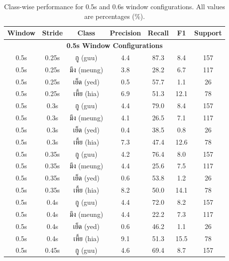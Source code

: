 \documentclass[11pt]{article}
\newcommand{\textthai}[1]{{\thaifont #1}}
\begin{document}
\begin{table}[H]
    \caption{Class-wise performance for 0.5s and 0.6s window configurations. All values are percentages (\%).}
    \centering
    \label{tab:class-performance-0.5-0.6}
    \scriptsize
    \setlength{\tabcolsep}{3pt}
    \begin{tabular}{|c|c|c|c|c|c|c|}
        \hline
        \textbf{Window} & \textbf{Stride} & \textbf{Class} & \textbf{Precision} & \textbf{Recall} & \textbf{F1} & \textbf{Support} \\
        \hline
        \multicolumn{7}{|c|}{\textbf{0.5s Window Configurations}} \\
        \hline
        0.5s & 0.25s & \textthai{กู} (guu) & 4.4 & 87.3 & 8.4 & 157 \\
        0.5s & 0.25s & \textthai{มึง} (meung) & 3.8 & 28.2 & 6.7 & 117 \\
        0.5s & 0.25s & \textthai{เย็ด} (yed) & 0.5 & 57.7 & 1.1 & 26 \\
        0.5s & 0.25s & \textthai{เหี้ย} (hia) & 6.9 & 51.3 & 12.1 & 78 \\
        \hline
        0.5s & 0.3s & \textthai{กู} (guu) & 4.4 & 79.0 & 8.4 & 157 \\
        0.5s & 0.3s & \textthai{มึง} (meung) & 4.1 & 26.5 & 7.1 & 117 \\
        0.5s & 0.3s & \textthai{เย็ด} (yed) & 0.4 & 38.5 & 0.8 & 26 \\
        0.5s & 0.3s & \textthai{เหี้ย} (hia) & 7.3 & 47.4 & 12.6 & 78 \\
        \hline
        0.5s & 0.35s & \textthai{กู} (guu) & 4.2 & 76.4 & 8.0 & 157 \\
        0.5s & 0.35s & \textthai{มึง} (meung) & 4.4 & 25.6 & 7.5 & 117 \\
        0.5s & 0.35s & \textthai{เย็ด} (yed) & 0.6 & 53.8 & 1.2 & 26 \\
        0.5s & 0.35s & \textthai{เหี้ย} (hia) & 8.2 & 50.0 & 14.1 & 78 \\
        \hline
        0.5s & 0.4s & \textthai{กู} (guu) & 4.4 & 72.0 & 8.2 & 157 \\
        0.5s & 0.4s & \textthai{มึง} (meung) & 4.4 & 22.2 & 7.3 & 117 \\
        0.5s & 0.4s & \textthai{เย็ด} (yed) & 0.6 & 46.2 & 1.1 & 26 \\
        0.5s & 0.4s & \textthai{เหี้ย} (hia) & 9.1 & 51.3 & 15.5 & 78 \\
        \hline
        0.5s & 0.45s & \textthai{กู} (guu) & 4.6 & 69.4 & 8.7 & 157 \\

\end{tabular}
\end{table}
\end{document}
